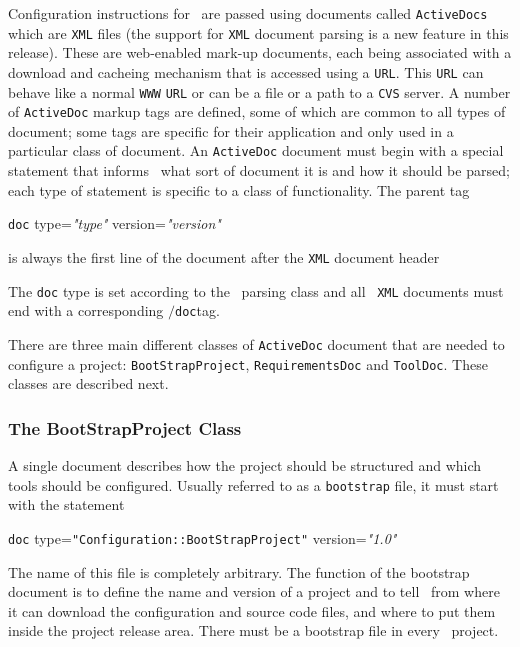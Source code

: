 \ni Configuration instructions for \scram\ are passed using documents called
\texttt{ActiveDocs} which are \texttt{XML} files (the support for
\texttt{XML} document parsing is a new feature in this release).
These are web-enabled mark-up documents, each being associated with a
download and cacheing mechanism that is accessed using a \texttt{URL}. This
\texttt{URL} can behave like a normal \texttt{WWW} \texttt{URL} or can be a file or a
path to a \texttt{CVS} server. A number of \texttt{ActiveDoc} markup tags are
defined, some of which are common to all types of document; some tags
are specific for their application and only used in a particular class
of document.  An \texttt{ActiveDoc} document must begin with a special
statement that informs \scram\ what sort of document it is and how it
should be parsed; each type of statement is specific to a class of
functionality. The parent tag
\begin{tagprint}
  \lbkt\texttt{doc} type=\textit{"type"} version=\textit{"version"}\rbkt
\end{tagprint}
\ni is always the first line of the document after the \texttt{XML}
document header
\begin{tagprint}
  \xmldocheader
\end{tagprint}

\ni The \texttt{doc} type is set according to the \scram\ parsing
class and all \scram\ \texttt{XML} documents must end with a corresponding
\lbkt$/$\texttt{doc}\rbkt tag.

\ni There are three main different classes of \texttt{ActiveDoc} document
that are needed to configure a project: \texttt{BootStrapProject},
\texttt{RequirementsDoc} and \texttt{ToolDoc}. These classes are
described next.

\subsubsection{The BootStrapProject Class}\label{sec:bootstrapclass}
A single document describes how the project should be structured and
which tools should be configured. Usually referred to as a \texttt{bootstrap} file, it must start with
the statement 
\begin{tagprint}
  \lbkt\texttt{doc} type=\texttt{"Configuration::BootStrapProject"}
  version=\textit{"1.0"}\rbkt
\end{tagprint}
\ni The name of this file is completely arbitrary. The function of
the bootstrap document is to define the name and version of a project
and to tell \scram\ from where it can download the configuration and
source code files, and where to put them inside the project release
area. There must be a bootstrap file in every \scram\ project.


